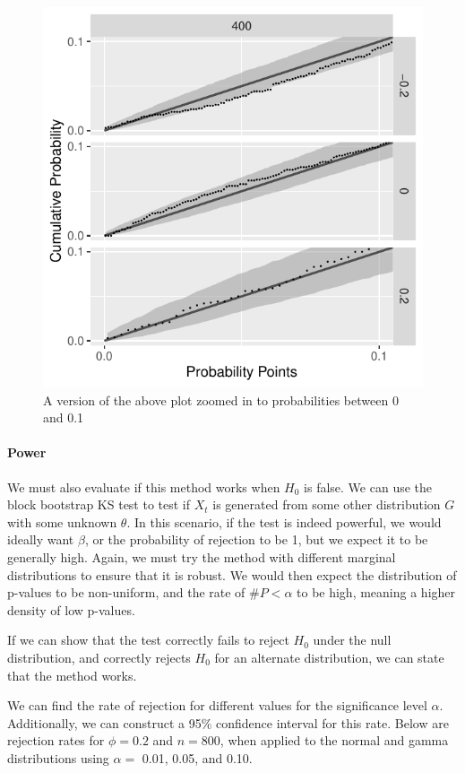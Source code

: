 \documentclass[12pt, letterpaper]{article}
\begin{document}
\begin{figure}[tbp]
  \centering
  \includegraphics[scale=1]{figures/zoom_gamma}
  \caption{A version of the above plot zoomed in to probabilities between 0 and
  0.1}
  \label{fig:mu}
\end{figure}


\paragraph{Power}
We must also evaluate if this method works when $H_0$ is false. We can use
the block bootstrap KS test to test if $X_t$ is generated from some other 
distribution $G$ with some unknown $\theta$. In this scenario, if the test is 
indeed powerful,
we would ideally want $\beta$, or the probability of rejection to be 1, but we
expect it to be generally high. Again, we must try the method with different
marginal distributions to ensure that it is robust.
We would then expect the distribution of p-values to be non-uniform, and the rate
of $\#P < \alpha$ to be high, meaning a higher density of low p-values.

If we can show that the test correctly fails to reject $H_0$ under the null
distribution, and correctly rejects $H_0$ for an alternate distribution, we can
state that the method works.

We can find the rate of rejection for  different values for the significance 
level $\alpha$. Additionally, we can construct a 95\% confidence interval for 
this rate. Below are rejection rates for $\phi = 0.2$ and $n = 800$, when
applied to the normal and gamma distributions using $\alpha =$ 0.01, 0.05, and 
0.10.
\end{document}
